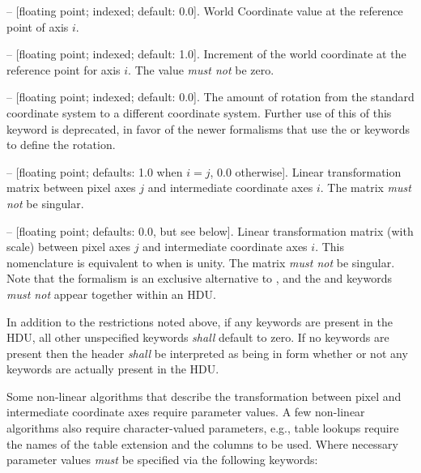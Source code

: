\documentclass[onecolumn]{aa}
\begin{document}
\begin{description}
\item {} -- [floating point; indexed; default: 0.0]. 
World Coordinate value at the reference point of axis $i$.

\item {} -- [floating point; indexed; default: 1.0]. 
Increment of the world coordinate at the reference point for axis $i$. 
The value {\em must not} be zero.

\item {} -- [floating point; indexed; default: 0.0].
The amount of rotation from the standard coordinate
system to a different coordinate system.  Further use of this of this keyword
is deprecated,  in favor of the newer formalisms that use the
 or  keywords to define the rotation.

\item {}  -- [floating point; defaults: 1.0 when $i=j$, 0.0
otherwise]. 
Linear transformation matrix between pixel axes $j$ and intermediate
coordinate axes $i$. The  matrix {\em must not} be singular. 

\item {}  -- [floating point; defaults: 0.0, but see below].
Linear transformation matrix (with scale) between pixel axes $j$ and intermediate
coordinate axes $i$. This nomenclature is equivalent to  when
 is unity. The  matrix {\em must not} be
singular. Note that the  formalism is an exclusive alternative to
, and the  and   keywords
{\em must not} appear together within an HDU. 

\end{description}

\noindent In addition to the restrictions noted above, if any 
keywords are present in the HDU, all other unspecified  keywords
{\em shall} default to zero. If no  keywords are present then
the header {\em shall} be interpreted as being in  form whether
or not any  keywords are actually present in the HDU.  

Some non-linear algorithms that describe the transformation between pixel and
intermediate coordinate axes require parameter values. A few non-linear algorithms
also require character-valued parameters, e.g., table lookups require the names of
the table extension and the columns to be used. Where necessary parameter values
{\em must} be specified via the following keywords: 
\end{document}
